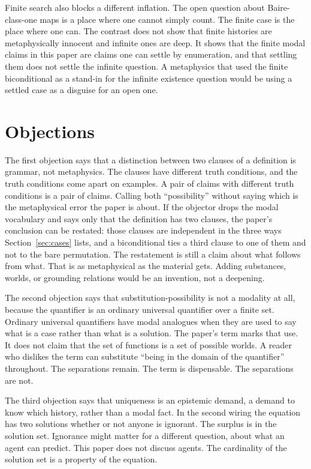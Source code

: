 \documentclass[11pt]{article}
\begin{document}
Finite search also blocks a different inflation. The open question about Baire-class-one maps is a place where one cannot simply count. The finite case is the place where one can. The contrast does not show that finite histories are metaphysically innocent and infinite ones are deep. It shows that the finite modal claims in this paper are claims one can settle by enumeration, and that settling them does not settle the infinite question. A metaphysics that used the finite biconditional as a stand-in for the infinite existence question would be using a settled case as a disguise for an open one.

\section{Objections}
\label{sec:obj}

The first objection says that a distinction between two clauses of a definition is grammar, not metaphysics. The clauses have different truth conditions, and the truth conditions come apart on examples. A pair of claims with different truth conditions is a pair of claims. Calling both ``possibility'' without saying which is the metaphysical error the paper is about. If the objector drops the modal vocabulary and says only that the definition has two clauses, the paper's conclusion can be restated: those clauses are independent in the three ways Section~\ref{sec:cases} lists, and a biconditional ties a third clause to one of them and not to the bare permutation. The restatement is still a claim about what follows from what. That is as metaphysical as the material gets. Adding substances, worlds, or grounding relations would be an invention, not a deepening.

The second objection says that substitution-possibility is not a modality at all, because the quantifier is an ordinary universal quantifier over a finite set. Ordinary universal quantifiers have modal analogues when they are used to say what is a case rather than what is a solution. The paper's term marks that use. It does not claim that the set of functions is a set of possible worlds. A reader who dislikes the term can substitute ``being in the domain of the quantifier'' throughout. The separations remain. The term is dispensable. The separations are not.

The third objection says that uniqueness is an epistemic demand, a demand to know which history, rather than a modal fact. In the second wiring the equation has two solutions whether or not anyone is ignorant. The surplus is in the solution set. Ignorance might matter for a different question, about what an agent can predict. This paper does not discuss agents. The cardinality of the solution set is a property of the equation.
\end{document}
